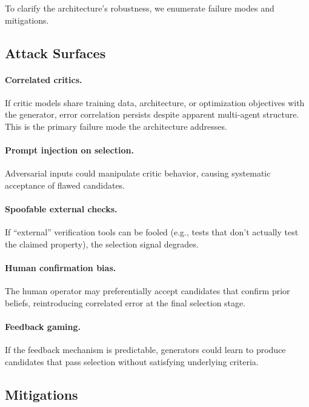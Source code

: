 \documentclass[11pt]{article}
\begin{document}
To clarify the architecture's robustness, we enumerate failure modes and mitigations.

\subsection{Attack Surfaces}

\paragraph{Correlated critics.} If critic models share training data, architecture, or optimization objectives with the generator, error correlation persists despite apparent multi-agent structure. This is the primary failure mode the architecture addresses.

\paragraph{Prompt injection on selection.} Adversarial inputs could manipulate critic behavior, causing systematic acceptance of flawed candidates.

\paragraph{Spoofable external checks.} If ``external'' verification tools can be fooled (e.g., tests that don't actually test the claimed property), the selection signal degrades.

\paragraph{Human confirmation bias.} The human operator may preferentially accept candidates that confirm prior beliefs, reintroducing correlated error at the final selection stage.

\paragraph{Feedback gaming.} If the feedback mechanism is predictable, generators could learn to produce candidates that pass selection without satisfying underlying criteria.

\subsection{Mitigations}
\end{document}
